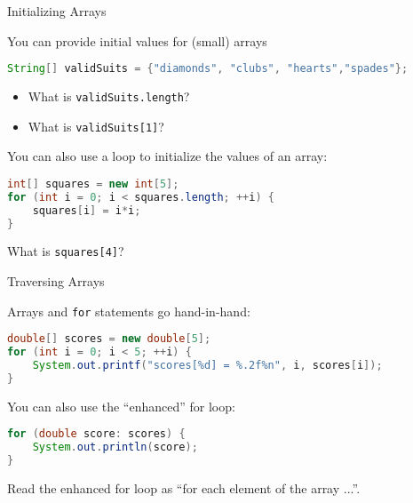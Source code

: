 \documentclass{beamer}
\begin{document}
\begin{frame}[fragile]{Initializing Arrays}


You can provide initial values for (small) arrays 
\begin{lstlisting}[language=Java]
String[] validSuits = {"diamonds", "clubs", "hearts","spades"};
\end{lstlisting}

\begin{itemize}
\item What is {\tt validSuits.length}?
\item What is {\tt validSuits[1]}?
\end{itemize}

You can also use a loop to initialize the values of an array:
\begin{lstlisting}[language=Java]
int[] squares = new int[5];
for (int i = 0; i < squares.length; ++i) {
    squares[i] = i*i;
}
\end{lstlisting}

What is {\tt squares[4]}? 

\end{frame}

\begin{frame}[fragile]{Traversing Arrays}


Arrays and {\tt for} statements go hand-in-hand:
\begin{lstlisting}[language=Java]
double[] scores = new double[5];
for (int i = 0; i < 5; ++i) {
    System.out.printf("scores[%d] = %.2f%n", i, scores[i]);
}    
\end{lstlisting}

You can also use the ``enhanced'' for loop:

\begin{lstlisting}[language=Java]
for (double score: scores) {
    System.out.println(score);
}
\end{lstlisting}

Read the enhanced for loop as ``for each element of the array ...''.

\end{frame}
\end{document}

